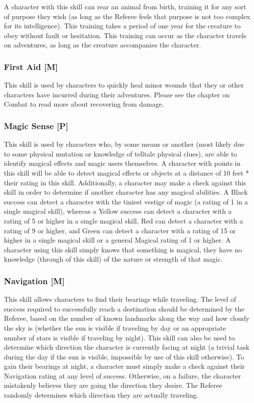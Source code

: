 \documentclass[oneside]{book}
\begin{document}
\begin{multicols}{2}
A character with this skill can rear an animal from birth, training it for any sort of purpose they wish (as long as the Referee feels that purpose is not too complex for its intelligence). This training takes a period of one year for the creature to obey without fault or hesitation. This training can occur as the character travels on adventures, as long as the creature accompanies the character. 

\subsubsection{First Aid [M]}
This skill is used by characters to quickly heal minor wounds that they or other characters have incurred during their adventures. Please see the chapter on Combat to read more about recovering from damage.

\subsubsection{Magic Sense [P]}
This skill is used by characters who, by some means or another (most likely due to some physical mutation or knowledge of telltale physical clues), are able to identify magical effects and magic users themselves. A character with points in this skill will be able to detect magical effects or objects at a distance of 10 feet * their rating in this skill. Additionally, a character may make a check against this skill in order to determine if another character has any magical abilities. A Black success can detect a character with the tiniest vestige of magic (a rating of 1 in a single magical skill), whereas a Yellow success can detect a character with a rating of 5 or higher in a single magical skill, Red can detect a character with a rating of 9 or higher, and Green  can detect a character with a rating of 15 or higher in a single magical skill or a general Magical rating of 1 or higher. A character using this skill simply knows that something is magical, they have no knowledge (through of this skill) of the nature or strength of that magic. 

\subsubsection{Navigation [M]}
This skill allows characters to find their bearings while traveling. The level of success required to successfully reach a destination should be determined by the Referee,  based on the number of known landmarks along the way and how cloudy the sky is (whether the sun is visible if traveling by day or an appropriate number of stars is visible if traveling by night). This skill can also be used to determine which direction the character is currently facing at night (a trivial task during the day if the sun is visible, impossible by use of this skill otherwise). To gain their bearings at night, a character must simply make a check against their Navigation rating at any level of success. Otherwise, on a failure, the character mistakenly believes they are going the direction they desire. The Referee randomly determines which direction they are actually traveling.


\end{multicols}
\end{document}
